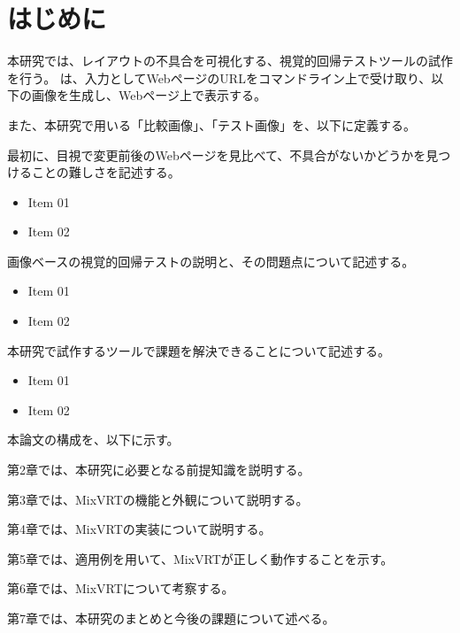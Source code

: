\chapter{はじめに}\label{cha:Introduction}
本研究では、レイアウトの不具合を可視化する、視覚的回帰テストツール\toolName の試作を行う。
\toolName は、入力としてWebページのURLをコマンドライン上で受け取り、以下の画像を生成し、Webページ上で表示する。

また、本研究で用いる「比較画像」、「テスト画像」を、以下に定義する。

\par
最初に、目視で変更前後のWebページを見比べて、不具合がないかどうかを見つけることの難しさを記述する。
\begin{itemize}
    \item Item 01
    \item Item 02
\end{itemize}

画像ベースの視覚的回帰テストの説明と、その問題点について記述する。
\begin{itemize}
    \item Item 01
    \item Item 02
\end{itemize}

本研究で試作するツールで課題を解決できることについて記述する。
\begin{itemize}
    \item Item 01
    \item Item 02
\end{itemize}

\par
本論文の構成を、以下に示す。\par
第2章では、本研究に必要となる前提知識を説明する。\par
第3章では、MixVRTの機能と外観について説明する。\par
第4章では、MixVRTの実装について説明する。\par
第5章では、適用例を用いて、MixVRTが正しく動作することを示す。\par
第6章では、MixVRTについて考察する。\par
第7章では、本研究のまとめと今後の課題について述べる。



